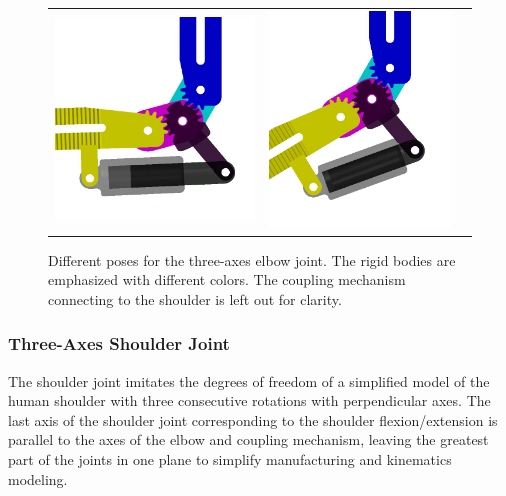 \documentclass[letterpaper, 10 pt, conference]{ieeeconf}  %
\begin{document}
\begin{figure}[tb!]
    \begin{tabular}{c c c}
        \includegraphics[height=0.5\linewidth]{figures/KAS6m3_SimMech_2.png} &
        \includegraphics[height=0.5\linewidth]{figures/KAS6m3_SimMech_3.png}
    \end{tabular}

    \caption{Different poses for the three-axes elbow joint. The rigid bodies are emphasized with different colors. The coupling mechanism connecting to the shoulder is left out for clarity.}
    \label{fig:EllenbogenSimMech}
\end{figure} 

\subsubsection{Three-Axes Shoulder Joint}

The shoulder joint imitates the degrees of freedom of a simplified model of the human shoulder with three consecutive rotations with perpendicular axes.
The last axis of the shoulder joint corresponding to the shoulder flexion/extension is parallel to the axes of the elbow and coupling mechanism, leaving the greatest part of the joints in one plane to simplify manufacturing and kinematics modeling.
\end{document}
